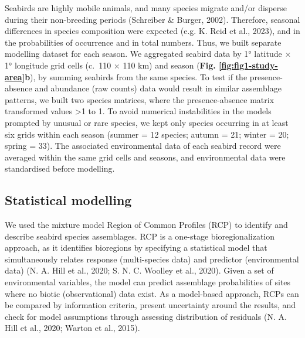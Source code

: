 \documentclass{article}
\begin{document}
Seabirds are highly mobile animals, and many species migrate and/or disperse during their non-breeding periods (Schreiber \& Burger, 2002). Therefore, seasonal differences in species composition were expected (e.g. K. Reid et al., 2023), and in the probabilities of occurrence and in total numbers. Thus, we built separate modelling dataset for each season. We aggregated seabird data by 1° latitude \(\times\) 1° longitude grid cells (c.~110 \(\times\) 110 km) and season (\textbf{Fig. \ref{fig:fig1-study-area}b}), by summing seabirds from the same species. To test if the presence-absence and abundance (raw counts) data would result in similar assemblage patterns, we built two species matrices, where the presence-absence matrix transformed values \textgreater1 to 1. To avoid numerical instabilities in the models prompted by unusual or rare species, we kept only species occurring in at least six grids within each season (summer = 12 species; autumn = 21; winter = 20; spring = 33). The associated environmental data of each seabird record were averaged within the same grid cells and seasons, and environmental data were standardised before modelling.

\hypertarget{statistical-modelling}{%
\subsection{Statistical modelling}\label{statistical-modelling}}

We used the mixture model Region of Common Profiles (RCP) to identify and describe seabird species assemblages. RCP is a one-stage bioregionalization approach, as it identifies bioregions by specifying a statistical model that simultaneously relates response (multi-species data) and predictor (environmental data) (N. A. Hill et al., 2020; S. N. C. Woolley et al., 2020). Given a set of environmental variables, the model can predict assemblage probabilities of sites where no biotic (observational) data exist. As a model-based approach, RCPs can be compared by information criteria, present uncertainty around the results, and check for model assumptions through assessing distribution of residuals (N. A. Hill et al., 2020; Warton et al., 2015).
\end{document}
